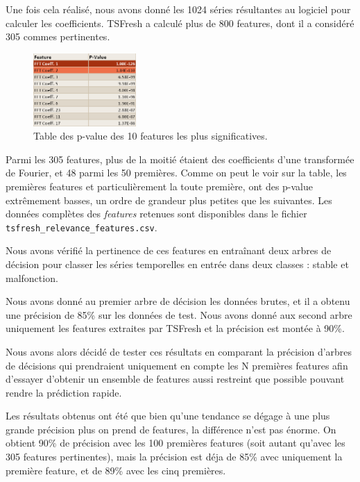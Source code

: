 \documentclass[french]{article}
\theoremstyle{mytheoremstyle}
\theoremstyle{mytheoremstyle}
\theoremstyle{myproblemstyle}
\begin{document}
        Une fois cela réalisé, nous avons donné les 1024 séries résultantes au logiciel pour calculer les coefficients. TSFresh a calculé plus de 800 features, dont il a considéré 305 commes pertinentes.
        
\begin{figure}[H]
            \centering
            \includegraphics[width=0.35\textwidth]{images/features_pvalue.png}
            \caption{Table des p-value des 10 features les plus significatives.}
            \label{}
        \end{figure}

        Parmi les 305 features, plus de la moitié étaient des coefficients d'une transformée de Fourier, et 48 parmi les 50 premières. Comme on peut le voir sur la table, les premières features et particulièrement la toute première, ont des p-value extrêmement basses, un ordre de grandeur plus petites que les suivantes. Les données complètes des \emph{features} retenues sont disponibles dans le fichier \texttt{tsfresh\_relevance\_features.csv}\cite{relevantfeatures}.
        
        Nous avons vérifié la pertinence de ces features en entraînant deux arbres de décision pour classer les séries temporelles en entrée dans deux classes : stable et malfonction.
        
        Nous avons donné au premier arbre de décision les données brutes, et il a obtenu une précision de 85\% sur les données de test. Nous avons donné aux second arbre uniquement les features extraites par TSFresh et la précision est montée à 90\%.
        
        Nous avons alors décidé de tester ces résultats en comparant la précision d'arbres de décisions qui prendraient uniquement en compte les N premières features afin d'essayer d'obtenir un ensemble de features aussi restreint que possible pouvant rendre la prédiction rapide. 
        
        Les résultats obtenus ont été que bien qu'une tendance se dégage à une plus grande précision plus on prend de features, la différence n'est pas énorme. On obtient 90\% de précision avec les 100 premières features (soit autant qu'avec les 305 features pertinentes), mais la précision est déja de 85\% avec uniquement la première feature, et de  89\% avec les cinq premières.
        
\end{document}
